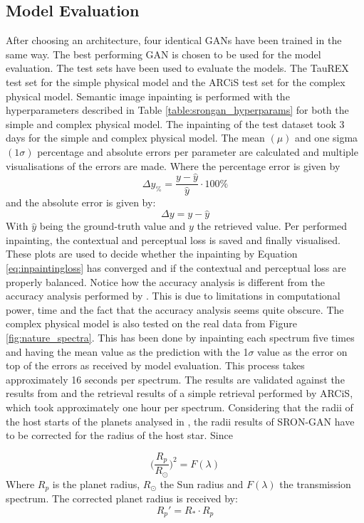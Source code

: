 \subsection{Model Evaluation}
After choosing an architecture, four identical GANs have been trained in the same way. The best performing GAN is chosen to be used for the model evaluation. The test sets have been used to evaluate the models. The TauREX test set for the simple physical model and the ARCiS test set for the complex physical model. Semantic image inpainting is performed with the hyperparameters described in Table \ref{table:srongan_hyperparams} for both the simple and complex physical model. The inpainting of the test dataset took 3 days for the simple and complex physical model. The mean $(\mu)$ and one sigma $(1\sigma)$ percentage and absolute errors per parameter are calculated and multiple visualisations of the errors are made. Where the percentage error is given by
\begin{equation}
    \Delta y_{\%} = \frac{y-\hat{y}}{\hat{y}}\cdot 100\%
    \label{eq:perc_error}
\end{equation}
and the absolute error is given by:
\begin{equation}
    \Delta y = y-\hat{y}    
\end{equation}
With $\hat{y}$ being the ground-truth value and $y$ the retrieved value. Per performed inpainting, the contextual and perceptual loss is saved and finally visualised. These plots are used to decide whether the inpainting by Equation \ref{eq:inpaintingloss} has converged and if the contextual and perceptual loss are properly balanced. Notice how the accuracy analysis is different from the accuracy analysis performed by \cite{zingales2018exogan}. This is due to limitations in computational power, time and the fact that the accuracy analysis seems quite obscure. The complex physical model is also tested on the real data from Figure \ref{fig:nature_spectra}. This has been done by inpainting each spectrum five times and having the mean value as the prediction with the 1$\sigma$ value as the error on top of the errors as received by model evaluation. This process takes approximately 16 seconds per spectrum. The results are validated against the results from \cite{sing2016continuum} and the retrieval results of a simple retrieval performed by ARCiS, which took approximately one hour per spectrum. Considering that the radii of the host starts of the planets analysed in , the radii results of SRON-GAN have to be corrected for the radius of the host star. Since

\begin{equation}
    \bigg( \frac{R_p}{R_{\odot}}\bigg)^2 = F(\lambda)
\end{equation}
Where $R_p$ is the planet radius, $R_{\odot}$ the Sun radius and $F(\lambda)$ the transmission spectrum. The corrected planet radius is received by:
\begin{equation}
    R_p' = R_* \cdot R_p
\end{equation}







